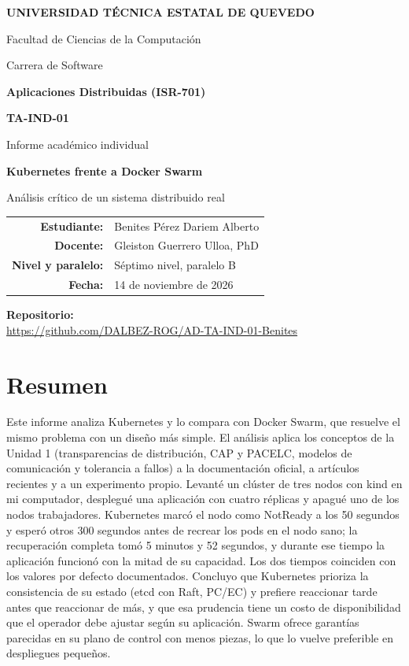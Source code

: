 \documentclass[11pt,a4paper]{article}
\newcommand{\repourl}{https://github.com/DALBEZ-ROG/AD-TA-IND-01-Benites}
\begin{document}
\begin{titlepage}
\centering
{\Large\bfseries UNIVERSIDAD TÉCNICA ESTATAL DE QUEVEDO\par}
\vspace{4pt}
{\large Facultad de Ciencias de la Computación\par}
{\large Carrera de Software\par}
\vspace{2cm}
{\large\bfseries Aplicaciones Distribuidas (ISR-701)\par}
\vspace{1cm}
{\Large\bfseries TA-IND-01\par}
\vspace{4pt}
{\large Informe académico individual\par}
\vspace{1.2cm}
{\LARGE\bfseries Kubernetes frente a Docker Swarm\par}
\vspace{4pt}
{\large Análisis crítico de un sistema distribuido real\par}
\vfill
\renewcommand{\arraystretch}{1.5}
\begin{tabular}{>{\bfseries}r l}
  Estudiante: & Benites Pérez Dariem Alberto \\
  Docente: & Gleiston Guerrero Ulloa, PhD \\
  Nivel y paralelo: & Séptimo nivel, paralelo B \\
  Fecha: & 14 de noviembre de 2026 \\
\end{tabular}
\vfill
{\bfseries Repositorio:}\\[4pt]
{\small\url{\repourl}}
\vspace{1cm}
\end{titlepage}

\section*{Resumen}

Este informe analiza Kubernetes y lo compara con Docker Swarm, que resuelve el mismo problema con un diseño más simple. El análisis aplica los conceptos de la Unidad 1 (transparencias de distribución, CAP y PACELC, modelos de comunicación y tolerancia a fallos) a la documentación oficial, a artículos recientes y a un experimento propio. Levanté un clúster de tres nodos con kind en mi computador, desplegué una aplicación con cuatro réplicas y apagué uno de los nodos trabajadores. Kubernetes marcó el nodo como NotReady a los 50 segundos y esperó otros 300 segundos antes de recrear los pods en el nodo sano; la recuperación completa tomó 5 minutos y 52 segundos, y durante ese tiempo la aplicación funcionó con la mitad de su capacidad. Los dos tiempos coinciden con los valores por defecto documentados. Concluyo que Kubernetes prioriza la consistencia de su estado (etcd con Raft, PC/EC) y prefiere reaccionar tarde antes que reaccionar de más, y que esa prudencia tiene un costo de disponibilidad que el operador debe ajustar según su aplicación. Swarm ofrece garantías parecidas en su plano de control con menos piezas, lo que lo vuelve preferible en despliegues pequeños.
\end{document}
